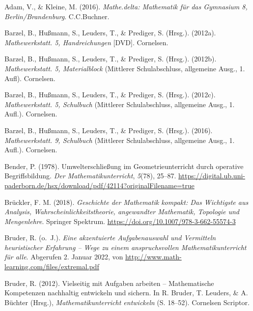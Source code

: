 \documentclass[
  ngerman,
]{scrbook}
\newlength{\cslhangindent}
\newlength{\cslentryspacingunit} %
\newenvironment{CSLReferences}[2] %
 {%
  \setlength{\parindent}{0pt}
  \ifodd #1
  \let\oldpar\par
  \def\par{\hangindent=\cslhangindent\oldpar}
  \fi
  \setlength{\parskip}{#2\cslentryspacingunit}
 }%
 {}
\theoremstyle{definition}
\theoremstyle{definition}
\theoremstyle{definition}
\theoremstyle{definition}
\theoremstyle{remark}
\begin{document}
\hypertarget{refs}{}
\begin{CSLReferences}{1}{0}
\leavevmode{}%
Adam, V., \& Kleine, M. (2016). \emph{Mathe.delta: {Mathematik} für das {Gymnasium} 8, {Berlin}/{Brandenburg}}. C.C.Buchner.

\leavevmode{}%
Barzel, B., Hußmann, S., Leuders, T., \& Prediger, S. (Hrsg.). (2012a). \emph{Mathewerkstatt. 5, {Handreichungen}} {[}DVD{]}. Cornelsen.

\leavevmode{}%
Barzel, B., Hußmann, S., Leuders, T., \& Prediger, S. (Hrsg.). (2012b). \emph{Mathewerkstatt. 5, {Materialblock}} (Mittlerer Schulabschluss, allgemeine Ausg., 1. Aufl). Cornelsen.

\leavevmode{}%
Barzel, B., Hußmann, S., Leuders, T., \& Prediger, S. (Hrsg.). (2012c). \emph{Mathewerkstatt. 5, {Schulbuch}} (Mittlerer Schulabschluss, allgemeine Ausg., 1. Aufl.). Cornelsen.

\leavevmode{}%
Barzel, B., Hußmann, S., Leuders, T., \& Prediger, S. (Hrsg.). (2016). \emph{Mathewerkstatt. 9, {Schulbuch}} (Mittlerer Schulabschluss, allgemeine Ausg., 1. Aufl.). Cornelsen.

\leavevmode{}%
Bender, P. (1978). Umwelterschließung im {Geometrieunterricht} durch operative {Begriffsbildung}. \emph{Der Mathematikunterricht}, \emph{5}(78), 25--87. \url{https://digital.ub.uni-paderborn.de/hsx/download/pdf/42114?originalFilename=true}

\leavevmode{}%
Brückler, F. M. (2018). \emph{Geschichte der {Mathematik} kompakt: {Das} {Wichtigste} aus {Analysis}, {Wahrscheinlichkeitstheorie}, angewandter {Mathematik}, {Topologie} und {Mengenlehre}}. Springer Spektrum. \url{https://doi.org/10.1007/978-3-662-55574-3}

\leavevmode{}%
Bruder, R. (o.~J.). \emph{Eine akzentuierte {Aufgabenauswahl} und {Vermitteln} heuristischer {Erfahrung} -- {Wege} zu einem anspruchsvollen {Mathematikunterricht} für alle}. Abgerufen 2. Januar 2022, von \url{http://www.math-learning.com/files/extremal.pdf}

\leavevmode{}%
Bruder, R. (2012). Vielseitig mit {Aufgaben} arbeiten -- {Mathematische} {Kompetenzen} nachhaltig entwickeln und sichern. In R. Bruder, T. Leuders, \& A. Büchter (Hrsg.), \emph{Mathematikunterricht entwickeln} (S. 18--52). Cornelsen Scriptor.


\end{CSLReferences}
\end{document}

